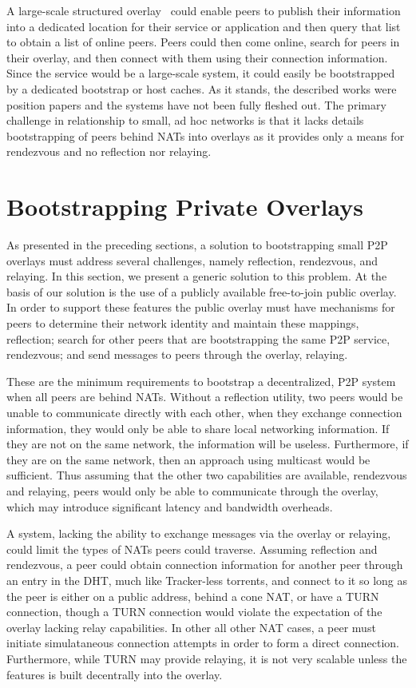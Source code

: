\documentclass[conference]{IEEEtran}
\begin{document}
A large-scale structured overlay~\cite{one_ring, p2p_bootstrap} could enable
peers to publish their information into a dedicated location for their service
or application and then query that list to obtain a list of online peers.
Peers could then come online, search for peers in their overlay, and then
connect with them using their connection information.  Since the service would
be a large-scale system, it could easily be bootstrapped by a dedicated
bootstrap or host caches.  As it stands, the described works were position
papers and the systems have not been fully fleshed out.  The primary challenge
in relationship to small, ad hoc networks is that it lacks details
bootstrapping of peers behind NATs into overlays as it provides only a means
for rendezvous and no reflection nor relaying.

\section{Bootstrapping Private Overlays}
\label{our_contribution}

As presented in the preceding sections, a solution to bootstrapping small P2P
overlays must address several challenges, namely reflection, rendezvous, and
relaying.  In this section, we present a generic solution to this problem.  At
the basis of our solution is the use of a publicly available free-to-join
public overlay.  In order to support these features the public overlay must
have mechanisms for peers to determine their network identity and maintain
these mappings, reflection; search for other peers that are bootstrapping the
same P2P service, rendezvous; and send messages to peers through the overlay,
relaying.

These are the minimum requirements to bootstrap a decentralized, P2P system
when all peers are behind NATs.  Without a reflection utility, two peers would
be unable to communicate directly with each other, when they exchange
connection information, they would only be able to share local networking
information.  If they are not on the same network, the information will be
useless.  Furthermore, if they are on the same network, then an approach using
multicast would be sufficient.  Thus assuming that the other two capabilities
are available, rendezvous and relaying, peers would only be able to communicate
through the overlay, which may introduce significant latency and bandwidth
overheads.  

A system, lacking the ability to exchange messages via the overlay or relaying,
could limit the types of NATs peers could traverse.  Assuming reflection and
rendezvous, a peer could obtain connection information for another peer through
an entry in the DHT, much like Tracker-less torrents, and connect to it so long
as the peer is either on a public address, behind a cone NAT, or have a TURN
connection, though a TURN connection would violate the expectation of the
overlay lacking relay capabilities.  In other all other NAT cases, a peer must
initiate simulataneous connection attempts in order to form a direct
connection.  Furthermore, while TURN may provide relaying, it is not very
scalable unless the features is built decentrally into the overlay.
\end{document}
